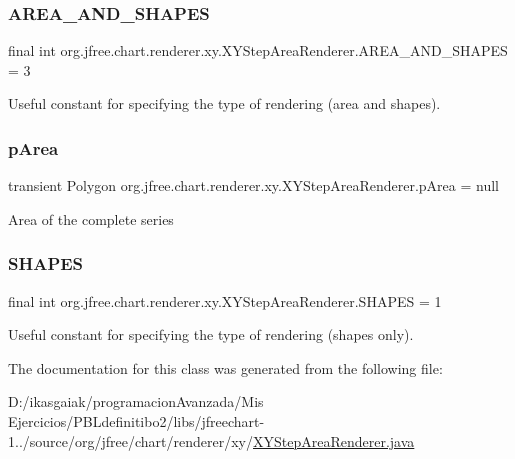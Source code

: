 \subsubsection{\texorpdfstring{A\+R\+E\+A\+\_\+\+A\+N\+D\+\_\+\+S\+H\+A\+P\+ES}{AREA\_AND\_SHAPES}}
{\footnotesize\ttfamily final int org.\+jfree.\+chart.\+renderer.\+xy.\+X\+Y\+Step\+Area\+Renderer.\+A\+R\+E\+A\+\_\+\+A\+N\+D\+\_\+\+S\+H\+A\+P\+ES = 3\hspace{0.3cm}{\ttfamily [static]}}

Useful constant for specifying the type of rendering (area and shapes). \mbox{\label{classorg_1_1jfree_1_1chart_1_1renderer_1_1xy_1_1_x_y_step_area_renderer_ab4e8e43e96cbcfdc03d6dcc8036c463b}} 
\subsubsection{\texorpdfstring{p\+Area}{pArea}}
{\footnotesize\ttfamily transient Polygon org.\+jfree.\+chart.\+renderer.\+xy.\+X\+Y\+Step\+Area\+Renderer.\+p\+Area = null\hspace{0.3cm}{\ttfamily [protected]}}

Area of the complete series \mbox{\label{classorg_1_1jfree_1_1chart_1_1renderer_1_1xy_1_1_x_y_step_area_renderer_aa5f77924da59c04ad3622239b18fad00}} 
\subsubsection{\texorpdfstring{S\+H\+A\+P\+ES}{SHAPES}}
{\footnotesize\ttfamily final int org.\+jfree.\+chart.\+renderer.\+xy.\+X\+Y\+Step\+Area\+Renderer.\+S\+H\+A\+P\+ES = 1\hspace{0.3cm}{\ttfamily [static]}}

Useful constant for specifying the type of rendering (shapes only). 

The documentation for this class was generated from the following file\+:\begin{DoxyCompactItemize}
\item 
D\+:/ikasgaiak/programacion\+Avanzada/\+Mis Ejercicios/\+P\+B\+Ldefinitibo2/libs/jfreechart-\/1../source/org/jfree/chart/renderer/xy/\mbox{\hyperlink{_x_y_step_area_renderer_8java}{X\+Y\+Step\+Area\+Renderer.\+java}}\end{DoxyCompactItemize}
